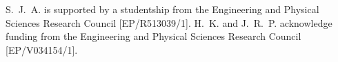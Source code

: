 \documentclass[aps,prl,twocolumn,10pt,groupedaddress]{revtex4-2}
\begin{document}
\appendix
\section{}

\begin{acknowledgments}
  S.~J.~A. is supported by a studentship from the Engineering and Physical Sciences Research Council [EP/R513039/1].
  H.~K. and J.~R.~P. acknowledge funding from the Engineering and Physical Sciences Research Council [EP/V034154/1].
\end{acknowledgments}


% 

\end{document}
